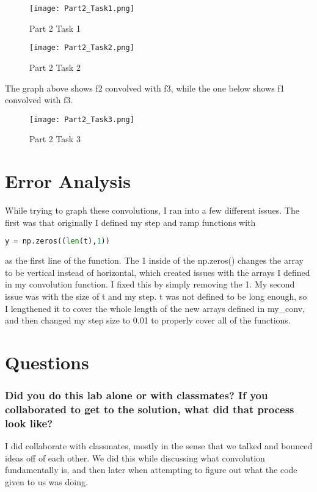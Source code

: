 \documentclass[12pt]{report}
\begin{document}
\begin{figure}[H]
    \centering
    \texttt{[image: Part2\_Task1.png]}
    \caption{Part 2 Task 1}
\end{figure}

\begin{figure}[H]
    \centering
    \texttt{[image: Part2\_Task2.png]}
    \caption{Part 2 Task 2}
\end{figure}

The graph above shows f2 convolved with f3, while the one below shows f1 convolved with f3.

\begin{figure}[H]
    \centering
    \texttt{[image: Part2\_Task3.png]}
    \caption{Part 2 Task 3}
\end{figure}
 
 \section{Error Analysis}
 
 While trying to graph these convolutions, I ran into a few different issues. The first was that originally I defined my step and ramp functions with 
 \begin{lstlisting}[language=Python]
 y = np.zeros((len(t),1))
 \end{lstlisting}
 as the first line of the function. The 1 inside of the np.zeros() changes the array to be vertical instead of horizontal, which created issues with the arrays I defined in my convolution function. I fixed this by simply removing the 1. My second issue was with the size of t and my step. t was not defined to be long enough, so I lengthened it to cover the whole length of the new arrays defined in my\_conv, and then changed my step size to 0.01 to properly cover all of the functions. 
 
 \section{Questions}
 \subsubsection{Did you do this lab alone or with classmates? If you collaborated to get to the solution, what did that process look like?}
 
 I did collaborate with classmates, mostly in the sense that we talked and bounced ideas off of each other. We did this while discussing what convolution fundamentally is, and then later when attempting to figure out what the code given to us was doing. 
 
\end{document}
